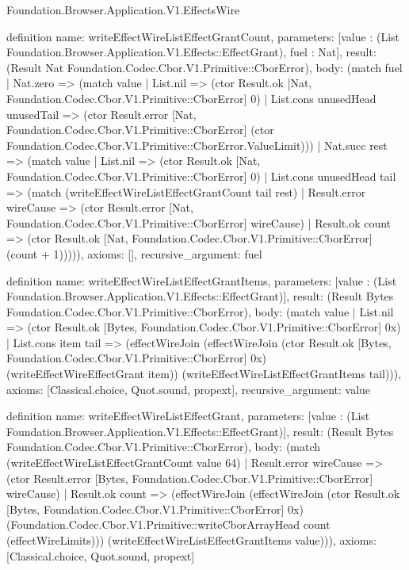 \begin{lexlean}{Foundation.Browser.Application.V1.EffectsWire}
\begin{semanticmodule}
definition{
  name: writeEffectWireListEffectGrantCount,
  parameters: [value : (List Foundation.Browser.Application.V1.Effects::EffectGrant), fuel : Nat],
  result: (Result Nat Foundation.Codec.Cbor.V1.Primitive::CborError),
  body: (match fuel
    | Nat.zero => (match value
      | List.nil => (ctor Result.ok [Nat, Foundation.Codec.Cbor.V1.Primitive::CborError] 0)
      | List.cons unusedHead unusedTail => (ctor Result.error [Nat, Foundation.Codec.Cbor.V1.Primitive::CborError] (ctor Foundation.Codec.Cbor.V1.Primitive::CborError.ValueLimit)))
    | Nat.succ rest => (match value
      | List.nil => (ctor Result.ok [Nat, Foundation.Codec.Cbor.V1.Primitive::CborError] 0)
      | List.cons unusedHead tail => (match (writeEffectWireListEffectGrantCount tail rest)
        | Result.error wireCause => (ctor Result.error [Nat, Foundation.Codec.Cbor.V1.Primitive::CborError] wireCause)
        | Result.ok count => (ctor Result.ok [Nat, Foundation.Codec.Cbor.V1.Primitive::CborError] (count + 1))))),
  axioms: [],
  recursive_argument: fuel
}

definition{
  name: writeEffectWireListEffectGrantItems,
  parameters: [value : (List Foundation.Browser.Application.V1.Effects::EffectGrant)],
  result: (Result Bytes Foundation.Codec.Cbor.V1.Primitive::CborError),
  body: (match value
    | List.nil => (ctor Result.ok [Bytes, Foundation.Codec.Cbor.V1.Primitive::CborError] 0x)
    | List.cons item tail => (effectWireJoin (effectWireJoin (ctor Result.ok [Bytes, Foundation.Codec.Cbor.V1.Primitive::CborError] 0x) (writeEffectWireEffectGrant item)) (writeEffectWireListEffectGrantItems tail))),
  axioms: [Classical.choice, Quot.sound, propext],
  recursive_argument: value
}

definition{
  name: writeEffectWireListEffectGrant,
  parameters: [value : (List Foundation.Browser.Application.V1.Effects::EffectGrant)],
  result: (Result Bytes Foundation.Codec.Cbor.V1.Primitive::CborError),
  body: (match (writeEffectWireListEffectGrantCount value 64)
    | Result.error wireCause => (ctor Result.error [Bytes, Foundation.Codec.Cbor.V1.Primitive::CborError] wireCause)
    | Result.ok count => (effectWireJoin (effectWireJoin (ctor Result.ok [Bytes, Foundation.Codec.Cbor.V1.Primitive::CborError] 0x) (Foundation.Codec.Cbor.V1.Primitive::writeCborArrayHead count (effectWireLimits))) (writeEffectWireListEffectGrantItems value))),
  axioms: [Classical.choice, Quot.sound, propext]
}


\end{semanticmodule}
\end{lexlean}
